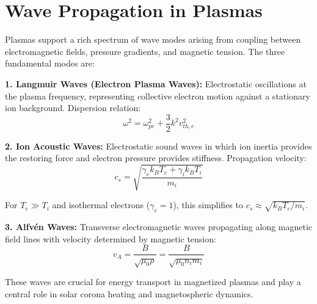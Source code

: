 \documentclass[11pt,a4paper]{article}
\begin{document}
\section{Wave Propagation in Plasmas}

Plasmas support a rich spectrum of wave modes arising from coupling between electromagnetic fields, pressure gradients, and magnetic tension. The three fundamental modes are:

\textbf{1. Langmuir Waves (Electron Plasma Waves):} Electrostatic oscillations at the plasma frequency, representing collective electron motion against a stationary ion background. Dispersion relation:
\begin{equation}
\omega^2 = \omega_{pe}^2 + \frac{3}{2} k^2 v_{th,e}^2
\end{equation}

\textbf{2. Ion Acoustic Waves:} Electrostatic sound waves in which ion inertia provides the restoring force and electron pressure provides stiffness. Propagation velocity:
\begin{equation}
c_s = \sqrt{\frac{\gamma_e k_B T_e + \gamma_i k_B T_i}{m_i}}
\end{equation}

For $T_e \gg T_i$ and isothermal electrons ($\gamma_e = 1$), this simplifies to $c_s \approx \sqrt{k_B T_e / m_i}$.

\textbf{3. Alfvén Waves:} Transverse electromagnetic waves propagating along magnetic field lines with velocity determined by magnetic tension:
\begin{equation}
v_A = \frac{B}{\sqrt{\mu_0 \rho}} = \frac{B}{\sqrt{\mu_0 n_i m_i}}
\end{equation}

These waves are crucial for energy transport in magnetized plasmas and play a central role in solar corona heating and magnetospheric dynamics.
\end{document}
